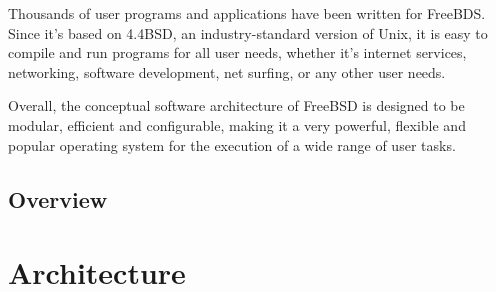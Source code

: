 \documentclass[12pt, dvipsnames, a4paper]{article}
\begin{document}
Thousands of user programs and applications have been written for FreeBDS. Since it’s based on 4.4BSD, an industry-standard version of Unix, it is easy to compile and run programs for all user needs, whether it’s internet services, networking, software development, net surfing, or any other user needs.

Overall, the conceptual software architecture of FreeBSD is designed to be modular, efficient and configurable, making it a very powerful, flexible and popular operating system for the execution of a wide range of user tasks.

\subsection{Overview}
\lipsum[1]

\section{Architecture}
\end{document}
